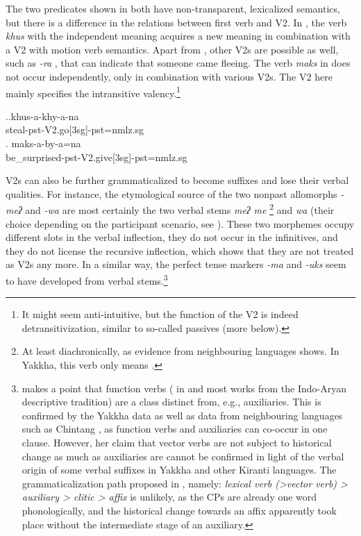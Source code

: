 The two predicates shown in \Next both have non-transparent, lexicalized semantics, but there is a difference in the relations between first verb and V2. In \Next[a], the verb \emph{khus} with the independent meaning  acquires a new meaning in combination with a V2 with motion verb semantics. Apart from , other V2s are possible as well, such as \emph{-ra} , that can indicate that someone came fleeing. The verb \emph{maks} in \Next[b] does not occur independently, only in combination with various V2s. The  V2 here mainly specifies the intransitive valency.\footnote{It might seem anti-intuitive, but the function of the V2  is indeed detransitivization, similar to so-called  passives (more below).} 

\ex.\ag.khus-a-khy-a-na\\
steal{\sc -pst-V2.go[3sg]-pst=nmlz.sg}\\
\bg. maks-a-by-a=na\\
be\_surprised{\sc -pst-V2.give[3sg]-pst=nmlz.sg}\\


V2s can also be further grammaticalized to become suffixes and lose their verbal qualities. For instance, the etymological source of the two nonpast allomorphs \emph{-meʔ} and \emph{-wa} are most certainly the two verbal stems \emph{meʔ \ti me} \footnote{At least diachronically, as evidence from neighbouring languages shows. In Yakkha, this verb only means .} and \emph{wa}  (their choice depending on the participant scenario, see ). These two morphemes occupy different slots in the verbal inflection,  they do not occur in the infinitives, and they do not license the recursive inflection, which shows that they are not treated as V2s any more. In a similar way, the perfect tense markers \emph{-ma} and \emph{-uks} seem to have developed from verbal stems.\footnote{\citet[66]{Butt2010_Light} makes a point that function verbs ( in \citet{Butt2010_Light} and most works from the  Indo-Aryan descriptive tradition) are a class distinct from, e.g., auxiliaries. This is confirmed by the Yakkha data as well as data from neighbouring languages such as Chintang \citep{Bickeletal2007Free}, as function verbs and auxiliaries can co-occur in one clause. However, her claim that vector verbs are not subject to historical change as much as auxiliaries are cannot be confirmed in light of the verbal origin of some verbal suffixes in Yakkha and other Kiranti languages. The grammaticalization path proposed in \citet[108]{Hopperetal1993Grammaticalization}, namely: \emph{lexical verb (>vector verb) > auxiliary > clitic > affix} is unlikely, as the CPs are already one word phonologically, and the historical change towards an affix apparently took place without the intermediate stage of an auxiliary.} 


